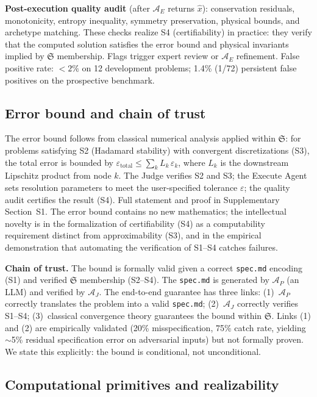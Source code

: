 \documentclass[11pt,a4paper]{article}
\newcommand{\Sclass}{\mathfrak{S}}
\newcommand{\Agent}{\mathcal{A}}
\begin{document}
\textbf{Post-execution quality audit} (after $\Agent_E$ returns $\hat{x}$): conservation residuals, monotonicity, entropy inequality, symmetry preservation, physical bounds, and archetype matching. These checks realize S4 (certifiability) in practice: they verify that the computed solution satisfies the error bound and physical invariants implied by $\Sclass$ membership. Flags trigger expert review or $\Agent_E$ refinement. False positive rate: $< 2\%$ on 12 development problems; 1.4\% (1/72) persistent false positives on the prospective benchmark.

\subsection{Error bound and chain of trust}

The error bound follows from classical numerical analysis applied within $\Sclass$: for problems satisfying S2 (Hadamard stability) with convergent discretizations (S3), the total error is bounded by $\varepsilon_{\text{total}} \leq \sum_{k} L_k \, \varepsilon_k$, where $L_k$ is the downstream Lipschitz product from node $k$. The Judge verifies S2 and S3; the Execute Agent sets resolution parameters to meet the user-specified tolerance $\varepsilon$; the quality audit certifies the result (S4). Full statement and proof in Supplementary Section~S1. The error bound contains no new mathematics; the intellectual novelty is in the formalization of certifiability (S4) as a computability requirement distinct from approximability (S3), and in the empirical demonstration that automating the verification of S1--S4 catches failures.

\textbf{Chain of trust.} The bound is formally valid given a correct \texttt{spec.md} encoding (S1) and verified $\Sclass$ membership (S2--S4). The \texttt{spec.md} is generated by $\Agent_P$ (an LLM) and verified by $\Agent_J$. The end-to-end guarantee has three links: (1)~$\Agent_P$ correctly translates the problem into a valid \texttt{spec.md}; (2)~$\Agent_J$ correctly verifies S1--S4; (3)~classical convergence theory guarantees the bound within $\Sclass$. Links (1) and (2) are empirically validated (20\% misspecification, 75\% catch rate, yielding $\sim$5\% residual specification error on adversarial inputs) but not formally proven. We state this explicitly: the bound is conditional, not unconditional.

\subsection{Computational primitives and realizability}
\end{document}
